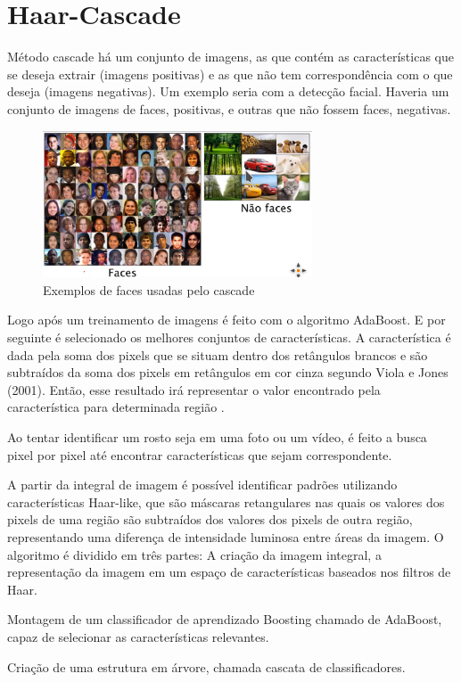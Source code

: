 \section{Haar-Cascade}\label{sec:haar-cascade}

Método cascade há um conjunto de imagens, as que contém as características que se deseja extrair (imagens positivas) e as que não tem correspondência com o que deseja (imagens negativas). Um exemplo seria com a detecção facial. Haveria um conjunto de imagens de faces, positivas, e outras que não fossem faces, negativas.


\begin{figure}[ht]
\centering
\includegraphics[width=8cm]{images/cascade.png}
\caption{Exemplos de faces usadas pelo cascade}
\label{fig:cascade}
\end{figure}


Logo após um treinamento de imagens é feito com o algoritmo AdaBoost. E por seguinte é selecionado os melhores conjuntos de características. A característica é dada pela soma dos pixels que se situam dentro dos retângulos brancos e são subtraídos da soma dos pixels em retângulos em cor cinza segundo Viola e Jones (2001). Então, esse resultado irá representar o valor encontrado pela característica para determinada região \cite{refer4}.

Ao tentar identificar um rosto seja em uma foto ou um vídeo, é feito a busca pixel por pixel até encontrar características que sejam correspondente. 

A partir da integral de imagem é possível identificar padrões utilizando características Haar-like, que são máscaras retangulares nas quais os valores dos pixels de uma região são subtraídos dos valores dos pixels de outra região, representando uma diferença de intensidade luminosa entre áreas da imagem. 
O algoritmo é dividido em três partes:
A criação da imagem integral, a representação da imagem em um espaço de características baseados nos filtros de Haar.

Montagem de um classificador de aprendizado Boosting chamado de AdaBoost, capaz de selecionar as características relevantes.

Criação de uma estrutura em árvore, chamada cascata de classificadores.
